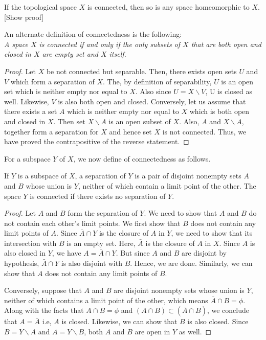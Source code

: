 \documentclass[a4paper,english,12pt]{article}
\begin{document}
\begin{rem}
If the topological space $X$ is connected, then so is any space homeomorphic to $X$. [Show proof] 
\end{rem}

An alternate definition of connectedness is the following: \\
\textit{A space $X$ is connected if and only if the only subsets of $X$ that are both open and closed in $X$ are empty set and $X$ itself.}
\begin{proof}
 Let $X$ be not connected but separable. Then, there exists open sets $U$ and $V$ which form a separation of $X$. The, by definition of separability, 
 $U$ is an open set which is neither empty nor equal to $X$. Also since $U = X \backslash V$, U is closed as well. Likewise, $V$ is also both open 
 and closed. Conversely, let us assume that there exists a set $A$ which is neither empty nor equal to $X$ which is both open and closed in $X$. 
 Then set $X \backslash A$ is an open subset of $X$. Also, $A$ and $X \backslash A$, together form a separation for $X$ and hence set $X$ is not 
 connected. Thus, we have proved the contrapositive of the reverse statement.
\end{proof}

For a subspace $Y$ of $X$, we now define of connectedness as follows.

\begin{thm}
 If $Y$ is a subspace of $X$, a separation of $Y$ is a pair of disjoint nonempty sets $A$ and $B$ whose union is $Y$, neither of which 
 contain a limit point of the other. The space $Y$ is connected if there exists no separation of $Y$. 
\end{thm}
\begin{proof}
 Let $A$ and $B$ form the separation of $Y$. We need to show that $A$ and $B$ do not contain each other's limit points. We first show that 
 $B$ does not contain any limit points of $A$. Since $\bar{A} \cap Y$ is the closure of $A$ in $Y$, we need to show that its intersection 
 with $B$ is an empty set. Here, $\bar{A}$ is the closure of $A$ in $X$. Since $A$ is also closed in $Y$, we have $A = \bar{A} \cap Y$.
 But since $A$ and $B$ are disjoint by hypothesis, $\bar{A} \cap Y$ is also disjoint with $B$. Hence, we are done. Similarly, we can show that 
 $A$ does not contain any limit points of $B$.
 
Conversely, suppose that $A$ and $B$ are disjoint nonempty sets whose union is $Y$, neither of which contains a limit point of the other,
which means $\bar{A} \cap B = \phi$. Along with the facts that $ A \cap B = \phi$ and $(A \cap B) \subset (\bar{A} \cap B)$, we conclude that 
$A = \bar{A}$ i.e, $A$ is closed. Likewise, we can show that $B$ is also closed. Since $B = Y \backslash A$ and $A = Y \backslash B$, both 
$A$ and $B$ are open in $Y$ as well. 
\end{proof}
\end{document}
